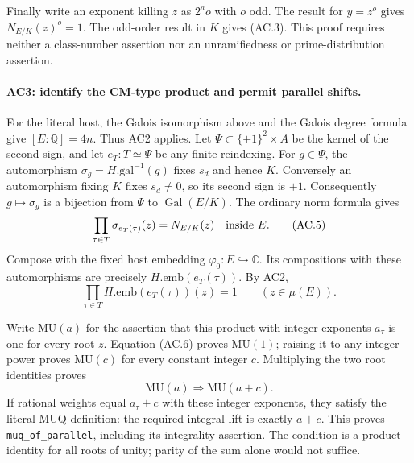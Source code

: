 \documentclass[11pt,a4paper]{article}
\numberwithin{equation}{section}
\theoremstyle{remark}\newtheorem{remark}[theorem]{Remark}
\begin{document}
Finally write an exponent killing $z$ as $2^a o$ with $o$ odd.
The result for $y=z^o$ gives $N_{E/K}(z)^o=1$.
The odd-order result in $K$ gives (AC.3).
This proof requires neither a class-number assertion nor an
unramifiedness or prime-distribution assertion.

\paragraph{AC3: identify the CM-type product and permit parallel shifts.}
For the literal host, the Galois isomorphism above and the Galois
degree formula give $[E:\mathbb Q]=4n$. Thus AC2 applies.
Let $\Psi\subset\{\pm1\}^2\times A$ be the kernel of the second
sign, and let $e_T:T\simeq\Psi$ be any finite reindexing.
For $g\in\Psi$, the automorphism $\sigma_g=H.\mathrm{gal}^{-1}(g)$
fixes $s_d$ and hence $K$. Conversely an automorphism fixing $K$
fixes $s_d\ne0$, so its second sign is $+1$.
Consequently $g\mapsto\sigma_g$ is a bijection from $\Psi$ to
$\operatorname{Gal}(E/K)$. The ordinary norm formula gives
\[
       \prod_{\tau\in T}\sigma_{e_T(\tau)}(z)=N_{E/K}(z)
                     \quad\hbox{inside }E.                  \tag{AC.5}
\]
Compose with the fixed host embedding $\varphi_0:E\hookrightarrow
\mathbb C$. Its compositions with these automorphisms are precisely
$H.\mathrm{emb}(e_T(\tau))$. By AC2,
\[
             \prod_{\tau\in T}H.\mathrm{emb}(e_T(\tau))(z)=1
                          \qquad(z\in\mu(E)).               \tag{AC.6}
\]

Write $\mathrm{MU}(a)$ for the assertion that this product with
integer exponents $a_\tau$ is one for every root $z$.
Equation (AC.6) proves $\mathrm{MU}(1)$; raising it to any integer
power proves $\mathrm{MU}(c)$ for every constant integer $c$.
Multiplying the two root identities proves
\[
                 \mathrm{MU}(a)\Longrightarrow
                      \mathrm{MU}(a+c).                     \tag{AC.7}
\]
If rational weights equal $a_\tau+c$ with these integer exponents,
they satisfy the literal $\mathrm{MUQ}$ definition: the required
integral lift is exactly $a+c$. This proves
\texttt{muq\_\allowbreak of\_\allowbreak parallel}, including its integrality assertion.
The condition is a product identity for all roots of unity; parity
of the sum alone would not suffice.
\end{document}

